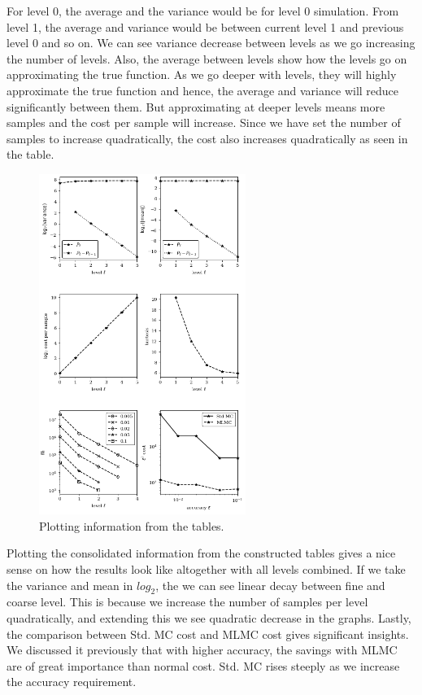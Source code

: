 \documentclass[12pt]{article}
\begin{document}
For level 0, the average and the variance would be for level 0 simulation. From level 1, the average and variance would be between current level 1 and previous level 0 and so on. We can see variance decrease between levels as we go increasing the number of levels. Also, the average between levels show how the levels go on approximating the true function. As we go deeper with levels, they will highly approximate the true function and hence, the average and variance will reduce significantly between them. But approximating at deeper levels means more samples and the cost per sample will increase. Since we have set the number of samples to increase quadratically, the cost also increases quadratically as seen in the table.

\begin{figure}[h!]
\centering
\includegraphics[width=0.6\textwidth]{opre_gbm1.png}
\caption{Plotting information from the tables.}
\end{figure}

Plotting the consolidated information from the constructed tables gives a nice sense on how the results look like altogether with all levels combined. If we take the variance and mean in $log_2$, the we can see linear decay between fine and coarse level. This is because we increase the number of samples per level quadratically, and extending this we see quadratic decrease in the graphs. Lastly, the comparison between Std. MC cost and MLMC cost gives significant insights. We discussed it previously that with higher accuracy, the savings with MLMC are of great importance than normal cost. Std. MC rises steeply as we increase the accuracy requirement.
\end{document}
